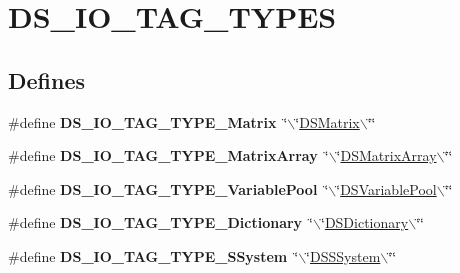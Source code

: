 \hypertarget{group___d_s___i_o___t_a_g___t_y_p_e_s}{
\section{DS\_\-IO\_\-TAG\_\-TYPES}
\label{group___d_s___i_o___t_a_g___t_y_p_e_s}
}
\subsection*{Defines}
\begin{DoxyCompactItemize}
\item 
\hypertarget{group___d_s___i_o___t_a_g___t_y_p_e_s_gad9110308f40b701fa7a8ac65d48716c6}{
\#define {\bfseries DS\_\-IO\_\-TAG\_\-TYPE\_\-Matrix}~\char`\"{}$\backslash$\char`\"{}\hyperlink{struct_d_s_matrix}{DSMatrix}$\backslash$\char`\"{}\char`\"{}}
\label{group___d_s___i_o___t_a_g___t_y_p_e_s_gad9110308f40b701fa7a8ac65d48716c6}

\item 
\hypertarget{group___d_s___i_o___t_a_g___t_y_p_e_s_ga26f0a22ebdc3e22f453d06fe231c3477}{
\#define {\bfseries DS\_\-IO\_\-TAG\_\-TYPE\_\-MatrixArray}~\char`\"{}$\backslash$\char`\"{}\hyperlink{struct_d_s_matrix_array}{DSMatrixArray}$\backslash$\char`\"{}\char`\"{}}
\label{group___d_s___i_o___t_a_g___t_y_p_e_s_ga26f0a22ebdc3e22f453d06fe231c3477}

\item 
\hypertarget{group___d_s___i_o___t_a_g___t_y_p_e_s_ga33b8d327f394e774d81e2702d27673ec}{
\#define {\bfseries DS\_\-IO\_\-TAG\_\-TYPE\_\-VariablePool}~\char`\"{}$\backslash$\char`\"{}\hyperlink{struct_d_s_variable_pool}{DSVariablePool}$\backslash$\char`\"{}\char`\"{}}
\label{group___d_s___i_o___t_a_g___t_y_p_e_s_ga33b8d327f394e774d81e2702d27673ec}

\item 
\hypertarget{group___d_s___i_o___t_a_g___t_y_p_e_s_ga48168f56a3bd807c4f677f50236f3fd9}{
\#define {\bfseries DS\_\-IO\_\-TAG\_\-TYPE\_\-Dictionary}~\char`\"{}$\backslash$\char`\"{}\hyperlink{struct_d_s_dictionary}{DSDictionary}$\backslash$\char`\"{}\char`\"{}}
\label{group___d_s___i_o___t_a_g___t_y_p_e_s_ga48168f56a3bd807c4f677f50236f3fd9}

\item 
\hypertarget{group___d_s___i_o___t_a_g___t_y_p_e_s_ga9e91e3c5dab3046aa518bf339e1f13e0}{
\#define {\bfseries DS\_\-IO\_\-TAG\_\-TYPE\_\-SSystem}~\char`\"{}$\backslash$\char`\"{}\hyperlink{struct_d_s_s_system}{DSSSystem}$\backslash$\char`\"{}\char`\"{}}
\label{group___d_s___i_o___t_a_g___t_y_p_e_s_ga9e91e3c5dab3046aa518bf339e1f13e0}


\end{DoxyCompactItemize}
